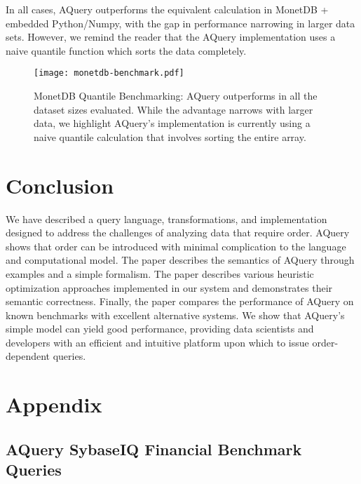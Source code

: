 \documentclass{acm_proc_article-sp}
\begin{document}
In all cases, AQuery outperforms the equivalent calculation in MonetDB + embedded Python/Numpy, with the gap in performance narrowing in larger data sets.  However, we remind the reader that the AQuery implementation uses a naive quantile function which sorts the data completely.

\begin{figure}[!htb]
\texttt{[image: monetdb-benchmark.pdf]}
\caption{MonetDB Quantile Benchmarking: AQuery outperforms in all the dataset sizes evaluated.
While the advantage narrows with larger data, we highlight AQuery's implementation is currently
using a naive quantile calculation that involves sorting the entire array.}
\label{monetdb-benchmark}
\end{figure}

\section{Conclusion}
We have described a query language, transformations, and implementation designed to address the challenges of analyzing
data that require order. AQuery shows that order can be
introduced with minimal complication to the language and computational model. The paper describes 
the semantics of AQuery through examples and a simple formalism.
The paper describes various heuristic optimization approaches 
implemented in our system and demonstrates their semantic 
correctness. Finally, the paper compares the
performance of AQuery on known  benchmarks with 
excellent alternative systems. We show that AQuery's simple model can yield good
performance, providing data scientists and developers with an efficient 
and intuitive platform upon which to issue order-dependent queries.

\clearpage
\section{Appendix}
\subsection{AQuery SybaseIQ Financial Benchmark Queries}
\small
\end{document}
